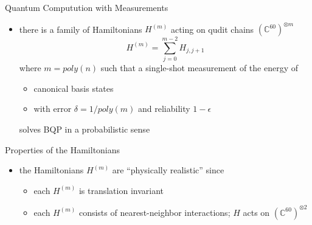 \documentclass[slideColor]{prosper}
\newcommand{\C}{{\mathbb{C}}}
\renewcommand{\>}{\rangle}
\newcommand{\<}{\langle}
\begin{document}

\begin{slide}{Quantum Computution with Measurements}
\begin{itemize}
\item there is a family of Hamiltonians $H^{(m)}$ acting on qudit chains $(\C^{60})^{\otimes m}$
\[
H^{(m)}=\sum_{j=0}^{m-2} H_{j,j+1}
\]
where $m=poly(n)$ such that a single-shot measurement of the energy of 

\begin{itemize}
\item canonical basis states 

\medskip
\item with error $\delta=1/poly(m)$ and reliability $1-\epsilon$ 
\end{itemize}

solves BQP in a probabilistic sense
\end{itemize}

\end{slide}


\begin{slide}{Properties of the Hamiltonians}

\begin{itemize}
\item the Hamiltonians $H^{(m)}$ are ``physically realistic'' since

\begin{itemize}
\item each $H^{(m)}$ is translation invariant

\medskip
\item each $H^{(m)}$ consists of nearest-neighbor interactions; $H$ acts on $(\C^{60})^{\otimes 2}$
\end{itemize}
\end{itemize}
\end{slide}

\end{document}
